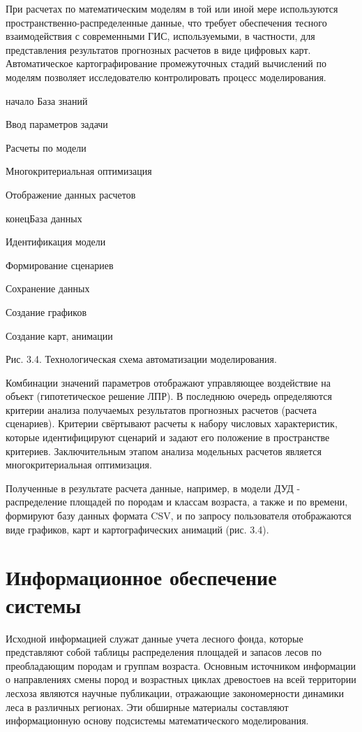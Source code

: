 При расчетах по математическим моделям в той или иной мере используются пространственно-распределенные данные, что требует обеспечения тесного взаимодействия с современными ГИС, используемыми, в частности, для представления результатов прогнозных расчетов в виде цифровых карт. Автоматическое картографирование промежуточных стадий вычислений по моделям позволяет исследователю контролировать процесс моделирования.

\begin{center}
начало
База знаний

Ввод параметров задачи

Расчеты по модели

Многокритериальная оптимизация

Отображение данных расчетов

конецБаза данных

Идентификация модели

Формирование сценариев

Сохранение данных

Создание графиков

Создание карт, анимации

Рис. 3.4. Технологическая схема автоматизации
моделирования.
\end{center}

Комбинации значений параметров отображают управляющее воздействие на объект (гипотетическое решение ЛПР). В последнюю очередь определяются критерии\textit{ }анализа получаемых результатов прогнозных расчетов (расчета сценариев). Критерии свёртывают расчеты к набору числовых характеристик, которые идентифицируют сценарий и задают его положение в пространстве\textit{ }критериев. Заключительным этапом анализа модельных расчетов является многокритериальная оптимизация.

Полученные в результате расчета данные, например, в модели ДУД - распределение площадей по породам и классам возраста, а также и по времени, формируют базу данных формата CSV, и по запросу пользователя отображаются виде графиков, карт и  картографических анимаций (рис. 3.4).\label{HToc128995781}\label{HToc199746727}

\section{Информационное обеспечение системы}

Исходной информацией служат данные учета лесного фонда, которые представляют собой таблицы распределения площадей и запасов лесов по преобладающим породам и группам возраста. Основным источником информации о направлениях смены пород и возрастных циклах древостоев на всей территории лесхоза являются научные публикации, отражающие закономерности динамики леса в различных регионах. Эти обширные материалы составляют информационную основу подсистемы математического моделирования.

